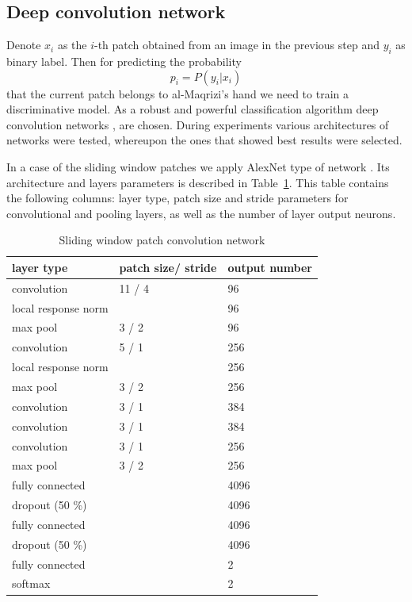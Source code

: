 \documentclass[conference]{IEEEtran}
\begin{document}
\subsection{Deep convolution network}

Denote $x_i$ as the $i$-th patch obtained from an image in the previous step and $y_i$ as binary label. Then for predicting the probability
\begin{equation*}
	p_i = P(y_i | x_i)
\end{equation*}
that the current patch belongs to al-Maqrizi's hand we need to train a discriminative model. As a robust and powerful classification algorithm deep convolution networks \cite{DL}, \cite{CNN} are chosen. During experiments various architectures of networks were tested, whereupon the ones that showed best results were selected.

In a case of the sliding window patches we apply AlexNet type of network \cite{Alexnet}. Its architecture and layers parameters is described in Table~\ref{alexnet_tab}. This table contains the following columns: layer type, patch size and stride parameters for convolutional and pooling layers, as well as the number of layer output neurons.%
\begin{table}[!b]
\centering
\caption{Sliding window patch convolution network}
\label{alexnet_tab}
\begin{tabular}{|l|p{1.3cm}|p{1.3cm}|}
\hline
\textbf{layer type} & \textbf{patch size/ stride} & \textbf{output number}  \\
\hline
convolution & 11 / 4 & 96 \\
\hline
local response norm & & 96 \\
\hline
max pool & 3 / 2 & 96 \\
\hline
convolution & 5 / 1 & 256 \\
\hline
local response norm & & 256 \\
\hline
max pool & 3 / 2 & 256 \\
\hline
convolution & 3 / 1 & 384 \\
\hline
convolution & 3 / 1 & 384 \\
\hline
convolution & 3 / 1 & 256 \\
\hline
max pool & 3 / 2 & 256 \\
\hline
fully connected & & 4096 \\
\hline
dropout (50 \%) & & 4096 \\
\hline
fully connected & & 4096 \\
\hline
dropout (50 \%) & & 4096 \\
\hline
fully connected & & 2 \\
\hline
softmax & & 2 \\
\hline
\end{tabular}
\end{table}
\end{document}
